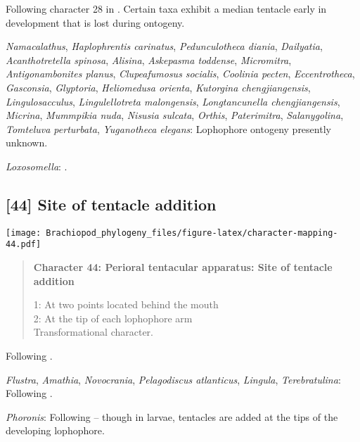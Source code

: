 \documentclass[openany]{book}
\theoremstyle{definition}
\theoremstyle{definition}
\theoremstyle{definition}
\theoremstyle{remark}
\begin{document}
Following character 28 in \citet{Carlson1995Phylogeneticrelationships}.
Certain taxa exhibit a median tentacle early in development that is lost
during ontogeny.

\hypertarget{Acanthotretella_spinosa-coding-43}{}
\emph{Namacalathus}, \emph{Haplophrentis carinatus},
\emph{Pedunculotheca diania}, \emph{Dailyatia}, \emph{Acanthotretella
spinosa}, \emph{Alisina}, \emph{Askepasma toddense}, \emph{Micromitra},
\emph{Antigonambonites planus}, \emph{Clupeafumosus socialis},
\emph{Coolinia pecten}, \emph{Eccentrotheca}, \emph{Gasconsia},
\emph{Glyptoria}, \emph{Heliomedusa orienta}, \emph{Kutorgina
chengjiangensis}, \emph{Lingulosacculus}, \emph{Lingulellotreta
malongensis}, \emph{Longtancunella chengjiangensis}, \emph{Micrina},
\emph{Mummpikia nuda}, \emph{Nisusia sulcata}, \emph{Orthis},
\emph{Paterimitra}, \emph{Salanygolina}, \emph{Tomteluva perturbata},
\emph{Yuganotheca elegans}: Lophophore ontogeny presently unknown.

\hypertarget{Loxosomella-coding-43}{}
\emph{Loxosomella}: \citet{Nielsen1966}.

\subsection*{{[}44{]} Site of tentacle
addition}\label{site-of-tentacle-addition}

\texttt{[image: Brachiopod\_phylogeny\_files/figure-latex/character-mapping-44.pdf]}

\begin{quote}
\textbf{Character 44: Perioral tentacular apparatus: Site of tentacle
addition}

1: At two points located behind the mouth\\
2: At the tip of each lophophore arm\\
Transformational character.
\end{quote}

Following \citet{Temereva2017Innervationof}.

\hypertarget{Amathia-coding-44}{}
\emph{Flustra}, \emph{Amathia}, \emph{Novocrania}, \emph{Pelagodiscus
atlanticus}, \emph{Lingula}, \emph{Terebratulina}: Following
\citet{Temereva2017Innervationof}.

\hypertarget{Phoronis-coding-44}{}
\emph{Phoronis}: Following \citet{Temereva2017Innervationof} -- though
in larvae, tentacles are added at the tips of the developing lophophore.
\end{document}
